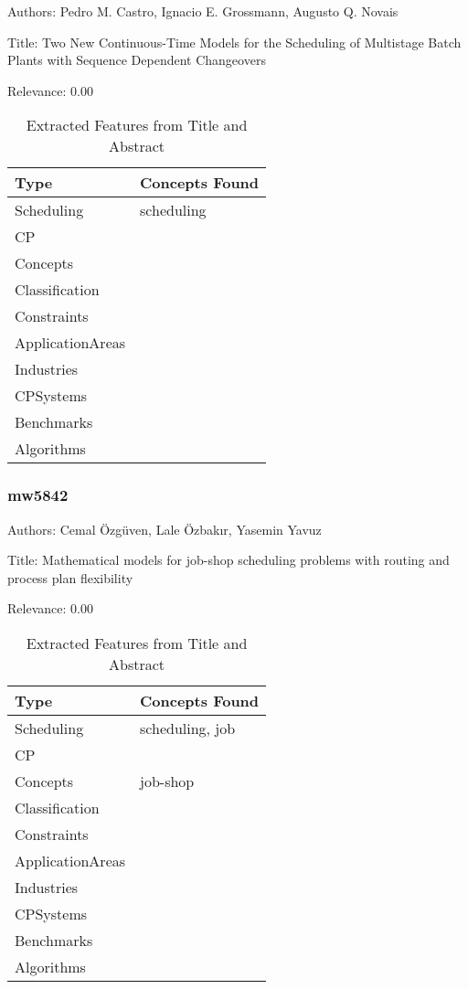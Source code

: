 Authors: Pedro M. Castro, Ignacio E. Grossmann, Augusto Q. Novais

Title: Two New Continuous-Time Models for the Scheduling of Multistage Batch Plants with Sequence Dependent Changeovers

Relevance:  0.00

{\scriptsize
\begin{longtable}{p{2cm}p{20cm}}
\caption{Extracted Features from Title and Abstract}\\ \toprule
Type & Concepts Found\\ \midrule
\endhead
\bottomrule
\endfoot
Scheduling & scheduling\\ 
CP & \\ 
Concepts & \\ 
Classification & \\ 
Constraints & \\ 
ApplicationAreas & \\ 
Industries & \\ 
CPSystems & \\ 
Benchmarks & \\ 
Algorithms & \\ 
\end{longtable}
}



\subsubsection{mw5842}
\label{mw:mw5842}

Authors: Cemal Özgüven, Lale Özbakır, Yasemin Yavuz

Title: Mathematical models for job-shop scheduling problems with routing and process plan flexibility

Relevance:  0.00

{\scriptsize
\begin{longtable}{p{2cm}p{20cm}}
\caption{Extracted Features from Title and Abstract}\\ \toprule
Type & Concepts Found\\ \midrule
\endhead
\bottomrule
\endfoot
Scheduling & scheduling, job\\ 
CP & \\ 
Concepts & job-shop\\ 
Classification & \\ 
Constraints & \\ 
ApplicationAreas & \\ 
Industries & \\ 
CPSystems & \\ 
Benchmarks & \\ 
Algorithms & \\ 
\end{longtable}
}



